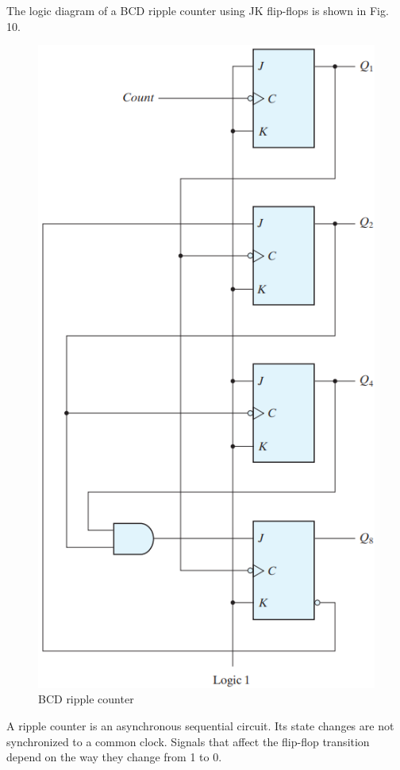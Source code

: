 \begin{multicols}{2}
The logic diagram of a BCD ripple counter using JK flip-flops is shown in Fig. 10.
\begin{figure}[H]
  \centering
  \includegraphics[width=.88\linewidth]{img/fig-6.10.png}
  \caption{BCD ripple counter}
  \label{fig:6.10}
\end{figure}

A ripple counter is an asynchronous sequential circuit. Its state changes are not synchronized to a common clock. Signals that affect the flip-flop transition depend on the way they change from 1 to 0.


\end{multicols}
